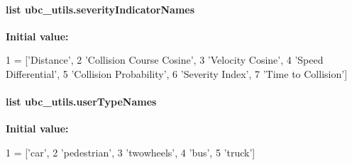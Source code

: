 \hypertarget{namespaceubc__utils_a549bb3c360005ade48b6727c1a951428}{
\paragraph[{severity\-Indicator\-Names}]{\setlength{\rightskip}{0pt plus 5cm}list ubc\-\_\-utils.\-severity\-Indicator\-Names}}\label{namespaceubc__utils_a549bb3c360005ade48b6727c1a951428}
{\bfseries Initial value\-:}
\begin{DoxyCode}
1 = [\textcolor{stringliteral}{'Distance'},
2                           \textcolor{stringliteral}{'Collision Course Cosine'},
3                           \textcolor{stringliteral}{'Velocity Cosine'},
4                           \textcolor{stringliteral}{'Speed Differential'},
5                           \textcolor{stringliteral}{'Collision Probability'},
6                           \textcolor{stringliteral}{'Severity Index'},
7                           \textcolor{stringliteral}{'Time to Collision'}]
\end{DoxyCode}
\hypertarget{namespaceubc__utils_a7c84647a9ae38b213b3653cd33d4a2bb}{
\paragraph[{user\-Type\-Names}]{\setlength{\rightskip}{0pt plus 5cm}list ubc\-\_\-utils.\-user\-Type\-Names}}\label{namespaceubc__utils_a7c84647a9ae38b213b3653cd33d4a2bb}
{\bfseries Initial value\-:}
\begin{DoxyCode}
1 = [\textcolor{stringliteral}{'car'},
2                  \textcolor{stringliteral}{'pedestrian'},
3                  \textcolor{stringliteral}{'twowheels'},
4                  \textcolor{stringliteral}{'bus'},
5                  \textcolor{stringliteral}{'truck'}]
\end{DoxyCode}
